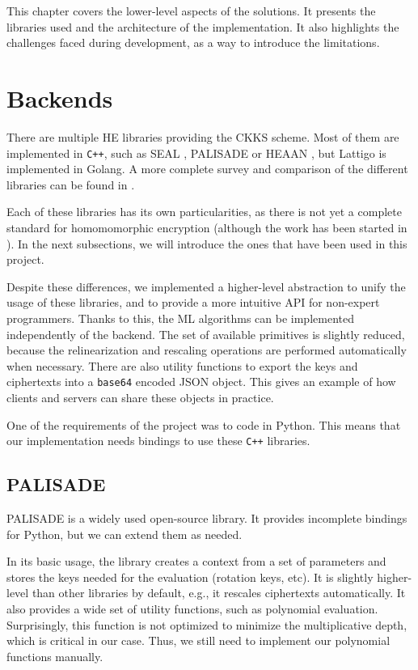\documentclass[a4paper,11pt,oneside]{report}
\begin{document}
This chapter covers the lower-level aspects of the solutions. 
It presents the libraries used and the architecture of the implementation.
It also highlights the challenges faced during development, as a way to introduce the limitations.

\section{Backends}
\label{sec:backends}

There are multiple HE libraries providing the CKKS scheme. Most of them are implemented in \texttt{C++}, such as SEAL \cite{microsoft_corporation_microsoft_2022}, PALISADE \cite{palisade_palisade_2022} or HEAAN \cite{cryptolab_inc_heaan_2022}, but Lattigo \cite{tune_insight_sa_lattigo_2022} is implemented in Golang. 
A more complete survey and comparison of the different libraries can be found in \cite{viand_sok_2021}.

Each of these libraries has its own particularities, as there is not yet a complete standard for homomomorphic encryption (although the work has been started in \cite{albrecht_homomorphic_2021}). 
In the next subsections, we will introduce the ones that have been used in this project.

Despite these differences, we implemented a higher-level abstraction to unify the usage of these libraries, and to provide a more intuitive API for non-expert programmers. 
Thanks to this, the ML algorithms can be implemented independently of the backend. 
The set of available primitives is slightly reduced, because the relinearization and rescaling operations are performed automatically when necessary.
There are also utility functions to export the keys and ciphertexts into a \texttt{base64} encoded JSON object.
This gives an example of how clients and servers can share these objects in practice.

One of the requirements of the project was to code in Python. 
This means that our implementation needs bindings to use these \texttt{C++} libraries.

\subsection{PALISADE}

PALISADE is a widely used open-source library. 
It provides incomplete bindings for Python, but we can extend them as needed. 

In its basic usage, the library creates a context from a set of parameters and stores the keys needed for the evaluation (rotation keys, etc). 
It is slightly higher-level than other libraries by default, e.g., it rescales ciphertexts automatically. 
It also provides a wide set of utility functions, such as polynomial evaluation. 
Surprisingly, this function is not optimized to minimize the multiplicative depth, which is critical in our case.
Thus, we still need to implement our polynomial functions manually.
\end{document}
